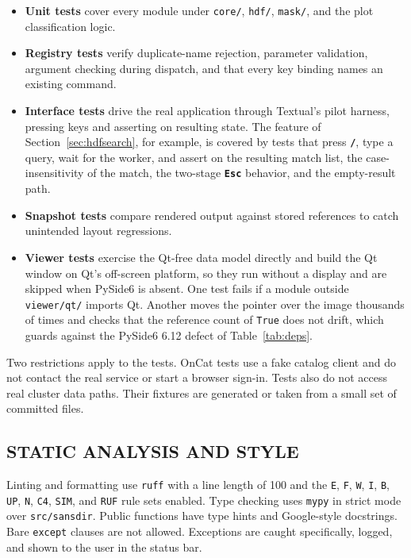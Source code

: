 \documentclass[tm]{ornltm}
\newcommand{\key}[1]{\textbf{\texttt{#1}}}
\begin{document}
\begin{itemize}
  \item \textbf{Unit tests} cover every module under \texttt{core/},
    \texttt{hdf/}, \texttt{mask/}, and the plot classification logic.
  \item \textbf{Registry tests} verify duplicate-name rejection, parameter
    validation, argument checking during dispatch, and that every key binding
    names an existing command.
  \item \textbf{Interface tests} drive the real application through Textual's
    pilot harness, pressing keys and asserting on resulting state. The feature of
    Section~\ref{sec:hdfsearch}, for example, is covered by tests that press
    \key{/}, type a query, wait for the worker, and assert on the resulting
    match list, the case-insensitivity of the match, the two-stage \key{Esc}
    behavior, and the empty-result path.
  \item \textbf{Snapshot tests} compare rendered output against stored
    references to catch unintended layout regressions.
  \item \textbf{Viewer tests} exercise the Qt-free data model directly and
    build the Qt window on Qt's off-screen platform, so they run without a
    display and are skipped when PySide6 is absent. One test fails if a module
    outside \texttt{viewer/qt/} imports Qt. Another moves the pointer over the
    image thousands of times and checks that the reference count of
    \texttt{True} does not drift, which guards against the PySide6 6.12 defect
    of Table~\ref{tab:deps}.
\end{itemize}

Two restrictions apply to the tests. OnCat tests use a fake catalog client and
do not contact the real service or start a browser sign-in. Tests also do not access real cluster data
paths. Their fixtures are generated or taken from a small set of committed
files.

\subsection{STATIC ANALYSIS AND STYLE}

Linting and formatting use \texttt{ruff} with a line length of 100 and the
\texttt{E}, \texttt{F}, \texttt{W}, \texttt{I}, \texttt{B}, \texttt{UP},
\texttt{N}, \texttt{C4}, \texttt{SIM}, and \texttt{RUF} rule sets enabled.
Type checking uses \texttt{mypy} in strict mode over \texttt{src/sansdir}.
Public functions have type hints and Google-style docstrings. Bare
\texttt{except} clauses are not allowed. Exceptions are caught specifically,
logged, and shown to the user in the status bar.
\end{document}
